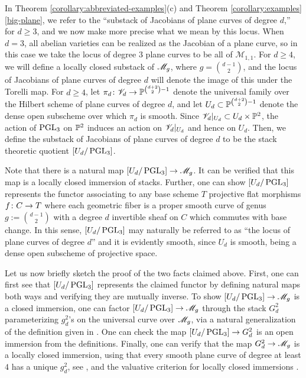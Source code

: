 \begin{remark}
	\label{remark:locus-of-plane-curves}
	In Theorem \ref{corollary:abbreviated-examples}(c) and Theorem \ref{corollary:examples}\autoref{big-plane},
	we refer to the ``substack of Jacobians of plane curves of degree $d$,'' for $d \geq 3$,
	and we now make more precise what we mean
	by this locus.
	When $d=3$, all abelian varieties can be realized as the Jacobian of a plane curve,
	so in this case we take the locus of degree $3$ plane curves to be all of $\mathscr M_{1,1}$.
	For $d \geq 4$, we will define a locally closed substack of ${\mathscr M_g}$, where $g = \binom{d-1}{2}$,
	and the locus of Jacobians of plane curves of degree $d$ will denote the image of this under the Torelli map.
	For $d \geq 4$, let $\pi_d\colon \mathscr V_d \rightarrow {\mathbb P}^{\binom{d+2}{2}-1}$ denote the universal family over 
	the Hilbert scheme of plane curves of degree $d$,
	and let $U_d \subset {\mathbb P}^{\binom{d+2}{2}-1}$ denote the dense open subscheme 
	over which $\pi_d$ is smooth.
	Since $\mathscr V_d|_{U_d} \subset U_d \times {\mathbb P}^2$,
	the action of $\operatorname{PGL}_3$ on ${\mathbb P}^2$ induces an action on $\mathscr V_d|_{U_d}$ and hence on $U_d$.
	Then, we define the substack of Jacobians of plane curves of degree $d$
	to be the stack theoretic quotient $[U_d/\operatorname{PGL}_3]$.
	
	Note that there is a natural map $[U_d/\operatorname{PGL}_3] \rightarrow {\mathscr M_g}$.
	It can be verified that this map is a locally closed immersion of stacks. Further, one
	can show $[U_d/\operatorname{PGL}_3]$ represents the functor associating to any base scheme $T$
	projective flat morphisms $f \colon C \rightarrow T$ where each geometric fiber is a proper smooth curve of genus $g := \binom{d-1}{2}$
	with a degree $d$ invertible sheaf on $C$ which commutes with base change.	
	In this sense, $[U_d/\operatorname{PGL}_3]$ may naturally be referred to as ``the locus of plane curves of degree $d$''
	and it is evidently smooth, since $U_d$ is smooth, being a dense open subscheme of projective space.

	Let us now briefly sketch the proof of the two facts claimed above.
	First, one can first see that $[U_d/\operatorname{PGL}_3]$ represents the claimed
	functor by defining natural maps both ways and verifying they are mutually inverse.
	To show $[U_d/\operatorname{PGL}_3] \rightarrow {\mathscr M_g}$ is a closed immersion,
	one can factor $[U_d/\operatorname{PGL}_3] \rightarrow {\mathscr M_g}$ through the stack $G^2_d$ parameterizing $g^2_d$'s on 
	the universal curve over ${\mathscr M_g}$,
	via a natural generalization of the definition given in \cite[Chapter XXI, Definition 3.12]{ACMG:geometryOfCurves}.
	One can check the map $[U_d/\operatorname{PGL}_3] \rightarrow G^2_d$ is an open immersion from the definitions.
	Finally, one can verify that the map $G^2_d \rightarrow {\mathscr M_g}$ is a locally closed immersion, using that
	every smooth plane curve of degree at least $4$ has a unique $g^2_d$, see \cite[Appendix A, Exercises 17 and 18]{ACGH:I},
	and the valuative criterion for locally closed immersions \cite[Chapter 1, Corollary 2.13]{mochizuki2014foundations}.
\end{remark}

